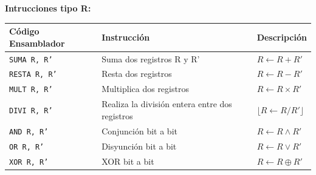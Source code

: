 \documentclass{article}
\begin{document}
\textbf{Intrucciones tipo R:}

\begin{longtable}{|p{}|p{}|p{}|}
  \hline
  \textbf{Código Ensamblador} & \textbf{Instrucción}                                                                                                                         & \textbf{Descripción}                                                                          \\
  \hline
  \texttt{SUMA R, R'}         & Suma dos registros R y R'                                                                                                                    & $R \leftarrow  R + R'$                                                                        \\
  \hline
  \texttt{RESTA R, R'}        & Resta dos registros                                                                                                                          & $R \leftarrow R - R'$                                                                         \\
  \hline
  \texttt{MULT R, R'}         & Multiplica dos registros                                                                                                                     & $R \leftarrow R \times R'$                                                                    \\
  \hline
  \texttt{DIVI R, R'}         & Realiza la división entera entre dos registros                                                                                               & $\lfloor R \leftarrow R / R' \rfloor$                                                         \\
  \hline
  \texttt{AND R, R'}          & Conjunción bit a bit                                                                                                                         & $R \leftarrow R \wedge R'$                                                                    \\
  \hline
  \texttt{OR R, R'}           & Disyunción bit a bit                                                                                                                         & $R \leftarrow R \vee R'$                                                                      \\
  \hline
  \texttt{XOR R, R'}          & XOR bit a bit                                                                                                                                & $R \leftarrow R \oplus R'$                                                                    \\

\end{longtable}
\end{document}
